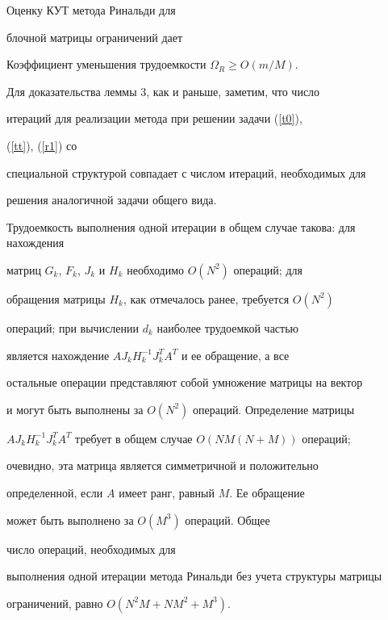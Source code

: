 Оценку КУТ метода Ринальди для


блочной матрицы ограничений дает





\begin{lem}\label{Olb7}


Коэффициент уменьшения трудоемкости $\Omega_R\ge O(m/M)$.


\end{lem}





Для доказательства леммы 3, как и раньше, заметим, что число


итераций для реализации метода при решении задачи (\ref{t0}),


(\ref{tt}), (\ref{r1}) со


специальной структурой совпадает с числом итераций, необходимых для


решения аналогичной задачи общего вида.





Трудоемкость выполнения одной итерации в общем случае такова: для нахождения


матриц $G_k$, $F_k$, $J_k$ и $H_k$ необходимо $O(N^2)$ операций; для


обращения матрицы $H_k$, как отмечалось ранее, требуется $O(N^2)$


операций; при вычислении $d_k$ наиболее трудоемкой частью


является нахождение $AJ_kH_k^{-1}J_k^TA^T$ и ее обращение, а все


остальные операции представляют собой умножение матрицы на вектор


и могут быть выполнены за $O(N^2)$ операций. Определение матрицы


$AJ_kH_k^{-1}J_k^TA^T$ требует в общем случае $O(NM(N+M))$ операций;


очевидно, эта матрица является симметричной и положительно


определенной, если $A$ имеет ранг, равный $M$. Ее обращение


может быть выполнено за $O(M^3)$ операций. Общее


число операций, необходимых для


выполнения одной итерации метода Ринальди без учета структуры матрицы


ограничений, равно $O(N^2M+NM^2+M^3)$.





